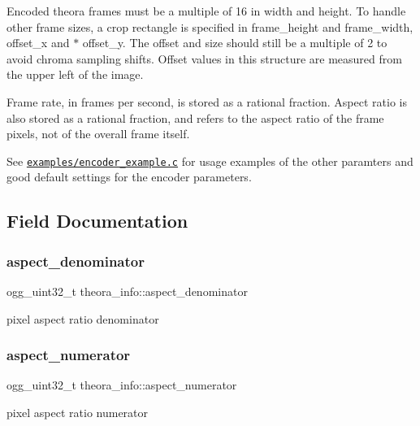 Encoded theora frames must be a multiple of 16 in width and height. To handle other frame sizes, a crop rectangle is specified in frame\+\_\+height and frame\+\_\+width, offset\+\_\+x and $\ast$ offset\+\_\+y. The offset and size should still be a multiple of 2 to avoid chroma sampling shifts. Offset values in this structure are measured from the upper left of the image.

Frame rate, in frames per second, is stored as a rational fraction. Aspect ratio is also stored as a rational fraction, and refers to the aspect ratio of the frame pixels, not of the overall frame itself.

See \href{http://svn.xiph.org/trunk/theora/examples/encoder_example.c}{\tt examples/encoder\+\_\+example.\+c} for usage examples of the other paramters and good default settings for the encoder parameters. 

\subsection{Field Documentation}
\mbox{\label{structtheora__info_afebc4d0cbfb34b68c833a8c79e83ae12}} 
\subsubsection{\texorpdfstring{aspect\+\_\+denominator}{aspect\_denominator}}
{\footnotesize\ttfamily ogg\+\_\+uint32\+\_\+t theora\+\_\+info\+::aspect\+\_\+denominator}

pixel aspect ratio denominator \mbox{\label{structtheora__info_a5a3ed8c79815fba1aa06c3f7d8e48b35}} 
\subsubsection{\texorpdfstring{aspect\+\_\+numerator}{aspect\_numerator}}
{\footnotesize\ttfamily ogg\+\_\+uint32\+\_\+t theora\+\_\+info\+::aspect\+\_\+numerator}

pixel aspect ratio numerator \mbox{\label{structtheora__info_a719a1d77a4a3bfeab79aa5747dbbb04c}} 
